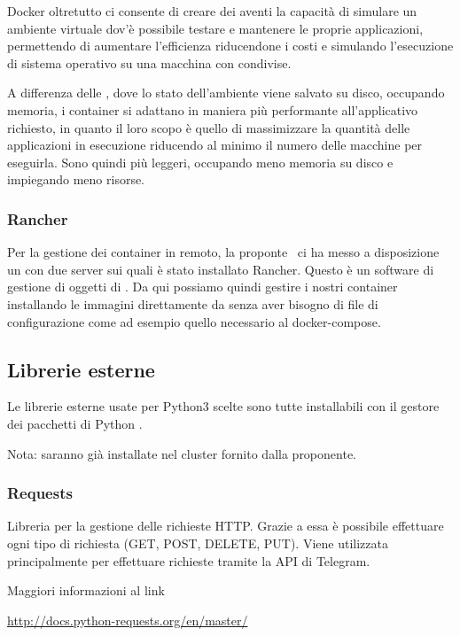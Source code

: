 Docker oltretutto ci consente di creare dei  aventi la capacità di simulare un ambiente virtuale dov'è possibile testare e mantenere le proprie applicazioni,
permettendo di aumentare l'efficienza riducendone i costi e simulando l'esecuzione di sistema operativo su una macchina con  condivise.

A differenza delle , dove lo stato dell'ambiente viene salvato su disco, occupando memoria, i container si adattano in maniera più performante
all'applicativo richiesto, in quanto il loro scopo è quello di massimizzare la quantità delle applicazioni in esecuzione riducendo al minimo il numero delle macchine per eseguirla.
Sono quindi più leggeri, occupando meno memoria su disco e impiegando meno risorse.

\subsubsection{Rancher}
Per la gestione dei container in remoto, la proponte \II~ci ha messo a disposizione un  con due server sui quali è stato installato Rancher. Questo
è un software di gestione di oggetti di .
Da qui possiamo quindi gestire i nostri container installando le immagini direttamente da  senza aver bisogno di file di configurazione
come ad esempio quello necessario al docker-compose.


\subsection{Librerie esterne}

Le librerie esterne usate per Python3 scelte sono tutte installabili con il gestore dei pacchetti di Python .

Nota: saranno già installate nel cluster fornito dalla proponente.

\subsubsection{Requests}
Libreria per la gestione delle richieste HTTP. Grazie a essa è possibile effettuare ogni tipo di richiesta (GET, POST, DELETE, PUT).
Viene utilizzata principalmente per effettuare richieste tramite la API di Telegram.

Maggiori informazioni al link

\begin{center}
    \url{http://docs.python-requests.org/en/master/}
\end{center}

